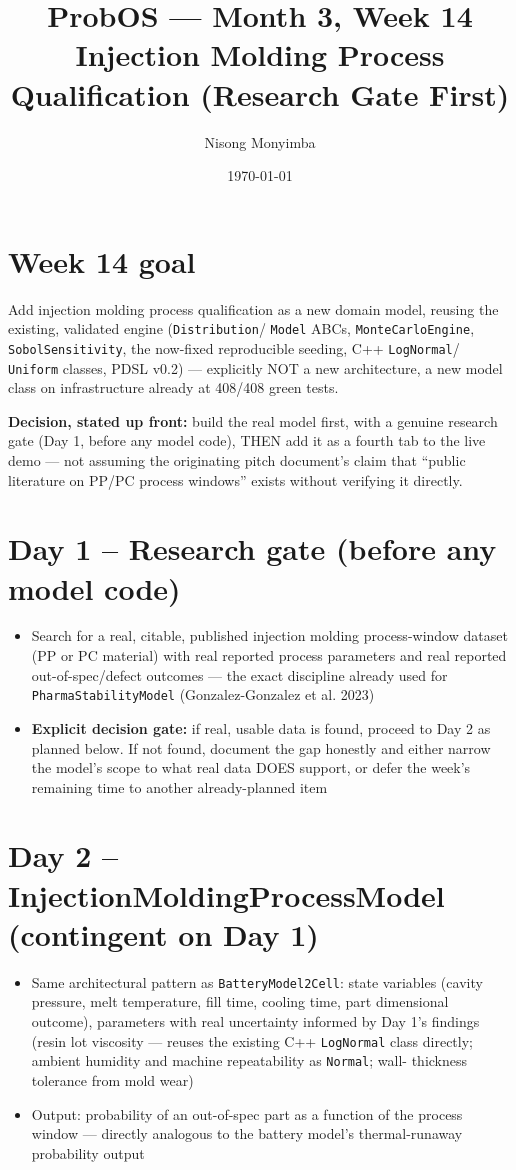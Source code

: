 \documentclass[11pt]{article}
\title{ProbOS --- Month 3, Week 14\\Injection Molding Process Qualification (Research Gate First)}
\author{Nisong Monyimba}
\date{\today}
\begin{document}
\maketitle

\section*{Week 14 goal}
Add injection molding process qualification as a new domain model,
reusing the existing, validated engine (\texttt{Distribution}/
\texttt{Model} ABCs, \texttt{MonteCarloEngine}, \texttt{SobolSensitivity},
the now-fixed reproducible seeding, C++ \texttt{LogNormal}/
\texttt{Uniform} classes, PDSL v0.2) --- explicitly NOT a new
architecture, a new model class on infrastructure already at
408/408 green tests.

\textbf{Decision, stated up front:} build the real model first, with
a genuine research gate (Day 1, before any model code), THEN add it
as a fourth tab to the live demo --- not assuming the originating
pitch document's claim that ``public literature on PP/PC process
windows'' exists without verifying it directly.

\section*{Day 1 -- Research gate (before any model code)}
\begin{itemize}[leftmargin=*]
  \item Search for a real, citable, published injection molding
    process-window dataset (PP or PC material) with real reported
    process parameters and real reported out-of-spec/defect outcomes
    --- the exact discipline already used for
    \texttt{PharmaStabilityModel} (Gonzalez-Gonzalez et al. 2023)
  \item \textbf{Explicit decision gate:} if real, usable data is
    found, proceed to Day 2 as planned below. If not found, document
    the gap honestly and either narrow the model's scope to what
    real data DOES support, or defer the week's remaining time to
    another already-planned item
\end{itemize}

\section*{Day 2 -- InjectionMoldingProcessModel (contingent on Day 1)}
\begin{itemize}[leftmargin=*]
  \item Same architectural pattern as \texttt{BatteryModel2Cell}:
    state variables (cavity pressure, melt temperature, fill time,
    cooling time, part dimensional outcome), parameters with real
    uncertainty informed by Day 1's findings (resin lot viscosity ---
    reuses the existing C++ \texttt{LogNormal} class directly; ambient
    humidity and machine repeatability as \texttt{Normal}; wall-
    thickness tolerance from mold wear)
  \item Output: probability of an out-of-spec part as a function of
    the process window --- directly analogous to the battery model's
    thermal-runaway probability output
\end{itemize}
\end{document}
